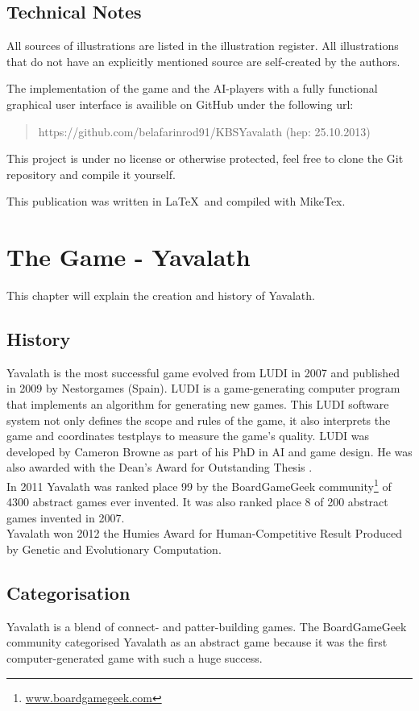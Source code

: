 \documentclass[english]{report} \usepackage[english]{babel}
\begin{document}
\section{Technical Notes}
All sources of illustrations are listed in the illustration register. All
illustrations that do not have an explicitly mentioned source are self-created by
the authors.


The implementation of the game and the AI-players with a fully functional
graphical user interface is availible on GitHub under the following url:
\begin{quotation}
    https://github.com/belafarinrod91/KBSYavalath (hep: 25.10.2013)
\end{quotation}
This project is under no license or otherwise protected, feel free to clone the
Git repository and compile it yourself.


This publication was written in \LaTeX \ and compiled with MikeTex.

\chapter{The Game - Yavalath}
\label{sec:chapter2}
This chapter will explain the creation and history of Yavalath.

\section{History}
Yavalath is the most successful game evolved from LUDI in 2007 and published in
2009 by Nestorgames (Spain). LUDI is a game-generating computer program that
implements an algorithm for generating new games. This LUDI software system not
only defines the scope and rules of the game, it also interprets the game and
coordinates testplays to measure the game's quality.
LUDI was developed by Cameron Browne as part of his PhD in AI and game design.
He was also awarded with the Dean's Award for Outstanding Thesis
\cite{EvolutionGameDesign}. \\

In 2011 Yavalath was ranked place 99 by the BoardGameGeek
community\footnote{\url{www.boardgamegeek.com}} of 4300 abstract games ever invented.
It was also ranked place 8 of 200 abstract games invented in 2007. \\

Yavalath won 2012 the Humies Award for Human-Competitive Result Produced by
Genetic and Evolutionary Computation.

\section{Categorisation}
Yavalath is a blend of connect- and patter-building games. The BoardGameGeek
community categorised Yavalath as an abstract game because it was the first
computer-generated game with such a huge success.
\end{document}
